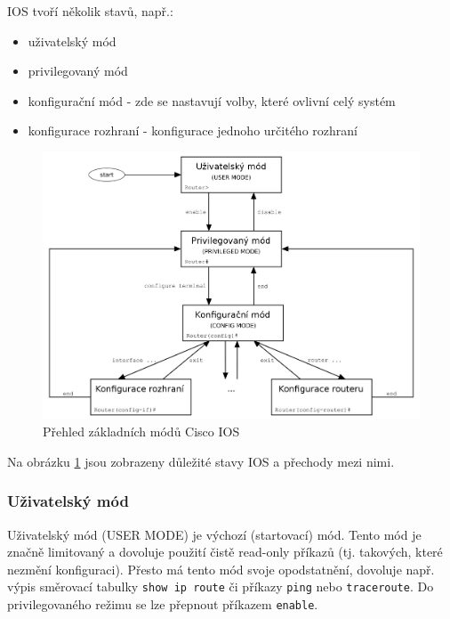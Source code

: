 IOS tvoří několik stavů, např.:
\begin{itemize}
 \item uživatelský mód
 \item privilegovaný mód
 \item konfigurační mód - zde se nastavují volby, které ovlivní celý systém
 \item konfigurace rozhraní - konfigurace jednoho určitého rozhraní
\end{itemize}

\begin{figure}[h]
\begin{center}
\includegraphics[width=13cm]{figures/ios.png}
\caption{Přehled základních módů Cisco IOS \cite{wiki:ios}}
\label{fig:ios}
\end{center}
\end{figure}

Na obrázku \ref{fig:ios} jsou zobrazeny důležité stavy IOS a přechody mezi nimi. 

\subsubsection{Uživatelský mód}
Uživatelský mód (USER MODE) je výchozí (startovací) mód. Tento mód je značně limitovaný a dovoluje použití čistě read-only příkazů (tj. takových, které nezmění konfiguraci). Přesto má tento mód svoje opodstatnění, dovoluje např. výpis směrovací tabulky \verb|show ip route| či příkazy \verb|ping| nebo \verb|traceroute|. Do privilegovaného režimu se lze přepnout příkazem \verb|enable|.

